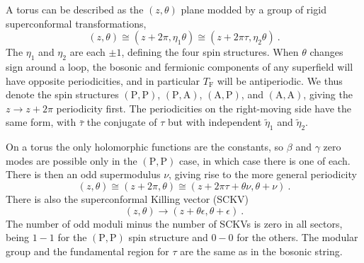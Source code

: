 A torus can be described as the $(z,\theta)$ plane modded by a group of rigid superconformal transformations,
\begin{equation}
	(z,\theta) \cong (z + 2\pi, \eta_1\theta) \cong (z + 2\pi\tau, \eta_2\theta) \:. \label{12.5.20}
\end{equation}
The $\eta_1$ and $\eta_2$ are each $\pm 1$, defining the four spin structures. When $\theta$ changes sign around a loop, the bosonic and fermionic components of any superfield will have opposite periodicities, and in particular $T_{\mathrm{F}}$ will be antiperiodic. We thus denote the spin structures $(\mathrm{P},\mathrm{P})$, $(\mathrm{P},\mathrm{A})$, $(\mathrm{A},\mathrm{P})$, and $(\mathrm{A},\mathrm{A})$, giving the $z \to z + 2\pi$ periodicity first. The periodicities on the right-moving side have the same form, with $\bar{\tau}$ the conjugate of $\tau$ but with independent $\tilde{\eta}_1$ and $\tilde{\eta}_2$.

On a torus the only holomorphic functions are the constants, so $\beta$ and $\gamma$ zero modes are possible only in the $(\mathrm{P},\mathrm{P})$ case, in which case there is one of each. There is then an odd supermodulus $\nu$, giving rise to the more general periodicity
\begin{equation}
	(z,\theta) \cong (z + 2\pi, \theta) \cong (z + 2\pi\tau + \theta\nu, \theta + \nu) \:. \label{12.5.21}
\end{equation}
There is also the superconformal Killing vector (SCKV)
\begin{equation}
	(z,\theta) \longrightarrow (z + \theta\epsilon, \theta + \epsilon) \:. \label{12.5.22}
\end{equation}
The number of odd moduli minus the number of SCKVs is zero in all sectors, being $1 - 1$ for the $(\mathrm{P},\mathrm{P})$ spin structure and $0 - 0$ for the others. The modular group and the fundamental region for $\tau$ are the same as in the bosonic string.

